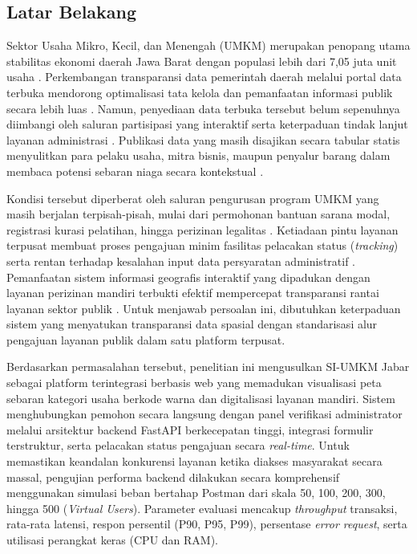 \documentclass[conference]{IEEEtran}
\begin{document}
\subsection{Latar Belakang}
Sektor Usaha Mikro, Kecil, dan Menengah (UMKM) merupakan penopang utama stabilitas ekonomi daerah Jawa Barat dengan populasi lebih dari 7,05 juta unit usaha \cite{b1,b2}. Perkembangan transparansi data pemerintah daerah melalui portal data terbuka mendorong optimalisasi tata kelola dan pemanfaatan informasi publik secara lebih luas \cite{b1,b3}. Namun, penyediaan data terbuka tersebut belum sepenuhnya diimbangi oleh saluran partisipasi yang interaktif serta keterpaduan tindak lanjut layanan administrasi \cite{b3,b4}. Publikasi data yang masih disajikan secara tabular statis menyulitkan para pelaku usaha, mitra bisnis, maupun penyalur barang dalam membaca potensi sebaran niaga secara kontekstual \cite{b1,b2,b5}.

Kondisi tersebut diperberat oleh saluran pengurusan program UMKM yang masih berjalan terpisah-pisah, mulai dari permohonan bantuan sarana modal, registrasi kurasi pelatihan, hingga perizinan legalitas \cite{b2,b4}. Ketiadaan pintu layanan terpusat membuat proses pengajuan minim fasilitas pelacakan status (\textit{tracking}) serta rentan terhadap kesalahan input data persyaratan administratif \cite{b3,b4}. Pemanfaatan sistem informasi geografis interaktif yang dipadukan dengan layanan perizinan mandiri terbukti efektif mempercepat transparansi rantai layanan sektor publik \cite{b5,b7}. Untuk menjawab persoalan ini, dibutuhkan keterpaduan sistem yang menyatukan transparansi data spasial dengan standarisasi alur pengajuan layanan publik dalam satu platform terpusat.

Berdasarkan permasalahan tersebut, penelitian ini mengusulkan SI-UMKM Jabar sebagai platform terintegrasi berbasis web yang memadukan visualisasi peta sebaran kategori usaha berkode warna dan digitalisasi layanan mandiri. Sistem menghubungkan pemohon secara langsung dengan panel verifikasi administrator melalui arsitektur backend FastAPI berkecepatan tinggi, integrasi formulir terstruktur, serta pelacakan status pengajuan secara \textit{real-time}. Untuk memastikan keandalan konkurensi layanan ketika diakses masyarakat secara massal, pengujian performa backend dilakukan secara komprehensif menggunakan simulasi beban bertahap Postman dari skala 50, 100, 200, 300, hingga 500 (\textit{Virtual Users}). Parameter evaluasi mencakup \textit{throughput} transaksi, rata-rata latensi, respon persentil (P90, P95, P99), persentase \textit{error request}, serta utilisasi perangkat keras (CPU dan RAM).
\end{document}
